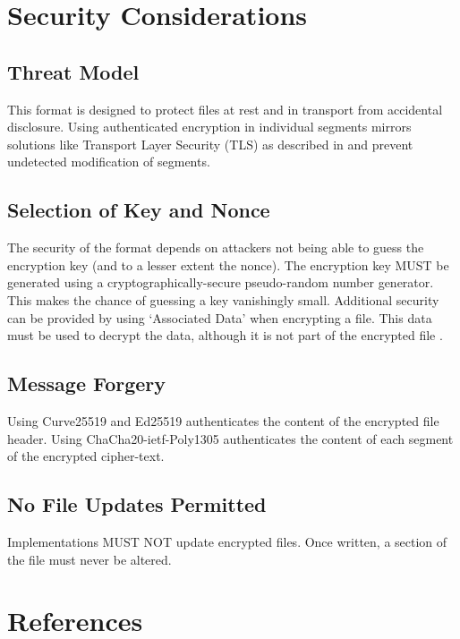 \documentclass[10pt]{article}
\begin{document}
\section{Security Considerations}
\subsection{Threat Model}
This format is designed to protect files at rest and in transport from accidental disclosure.
Using authenticated encryption in individual segments mirrors solutions like Transport Layer 
Security (TLS) as described in \cite{RFC5246} and prevent undetected modification of segments.

\subsection{Selection of Key and Nonce}
The security of the format depends on attackers not being able to guess the encryption key (and to a lesser extent 
the nonce).
The encryption key MUST be generated using a cryptographically-secure pseudo-random number generator.
This makes the chance of guessing a key vanishingly small.
Additional security can be provided by using `Associated Data' when encrypting a file.
This data must be used to decrypt the data, although it is not part of the encrypted file
\cite{RFC8439}.

\subsection{Message Forgery}
Using Curve25519 and Ed25519 authenticates the content of the encrypted file header.
Using ChaCha20-ietf-Poly1305 authenticates the content of each segment of the encrypted cipher-text. 

\subsection{No File Updates Permitted}
Implementations MUST NOT update encrypted files.
Once written, a section of the file must never be altered.

\section{References}
\end{document}
